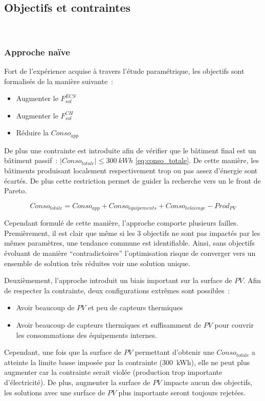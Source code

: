\subsection{Objectifs et contraintes} %
\label{sub:objectifs_et_contraintes}
~

\subsubsection{Approche naïve} %
\label{ssub:approche_naive}
Fort de l’expérience acquise à travers l’étude paramétrique, les objectifs sont formalisés
de la manière suivante~:
\begin{itemize}
  \item Augmenter le $F_{sol}^{ECS}$
  \item Augmenter le $F_{sol}^{CH}$
  \item Réduire la $Conso_{app}$
\end{itemize}
De plus une contrainte est introduite afin de vérifier que le bâtiment final
est un bâtiment passif~: $|Conso_{totale}| \leq \SI{300}{kWh}$ \eqref{eq:conso_totale}.
De cette manière, les bâtiments produisant localement respectivement trop ou pas assez d’énergie sont
écartés. De plus cette restriction permet de guider la recherche vers un le front de
Pareto.

\begin{equation} \label{eq:conso_totale}
  Conso_{totale} = Conso_{app} + Conso_{équipements} + Conso_{éclairage} - Prod_{PV}
\end{equation}

Cependant formulé de cette manière, l’approche comporte plusieurs failles. Premièrement,
il est clair que même si les \num{3} objectifs ne sont pas impactés par les mêmes
paramètres, une tendance commune est identifiable. Ainsi, sans objectifs évoluant de
manière \enquote{contradictoires} l’optimisation risque de converger vers un ensemble
de solution très réduites voir une solution unique.

Deuxièmement, l’approche introduit un biais important sur la surface de $PV$. Afin de
respecter la contrainte, deux configurations extrêmes sont possibles~:
\begin{itemize}
  \item Avoir beaucoup de $PV$ et peu de capteurs thermiques
  \item Avoir beaucoup de capteurs thermiques et suffisamment de $PV$ pour couvrir
        les consommations des équipements internes.
\end{itemize}
Cependant, une fois que la surface de $PV$ permettant d’obtenir une $Conso_{totale}$
a atteinte la limite basse imposée par la contrainte (\SI{300}{kWh}), elle ne peut plus
augmenter car la contrainte serait violée (production trop importante d’électricité). De plus,
augmenter la surface de $PV$ impacte aucun des objectifs, les solutions avec une surface
de $PV$ plus importante seront toujours rejetées.

